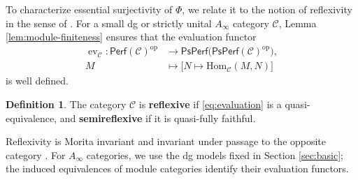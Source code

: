\documentclass[11pt,letterpaper,reqno]{amsart}
\theoremstyle{plain}
\theoremstyle{definition}
\newtheorem{definition}[definition]{Definition}
\theoremstyle{plain}
\theoremstyle{definition}
\numberwithin{equation}{section}
\begin{document}
To characterize essential surjectivity of $\Phi$, we relate it to the notion of reflexivity in the sense of \cite[Definition 2.1.1 and Remark 2.1.5(2)]{Booth-Goodbody-Opper2025}.
For a small dg or strictly unital $A_\infty$ category $\mathscr C$, Lemma \ref{lem:module-finiteness} ensures that the evaluation functor
\begin{equation}\label{eq:evaluation}
\begin{aligned}
\operatorname{ev}_{\mathscr C}:\mathsf{Perf}(\mathscr C)^{\mathrm{op}}
&\longrightarrow\mathsf{PsPerf}\bigl(\mathsf{PsPerf}(\mathscr C)^{\mathrm{op}}\bigr),\\
M&\longmapsto\bigl[N\longmapsto\mathrm{Hom}_{\mathscr C}(M,N)\bigr]
\end{aligned}
\end{equation}
is well defined. 

\begin{definition}\label{def:reflexivity}
The category $\mathscr C$ is \textbf{reflexive} if \eqref{eq:evaluation} is a quasi-equivalence, and \textbf{semireflexive} if it is quasi-fully faithful.
\end{definition}

Reflexivity is Morita invariant \cite[Proposition 3.8]{Goodbody2026} and invariant under passage to the opposite category \cite[Remark 2.1.5(1)]{Booth-Goodbody-Opper2025}.
For $A_\infty$ categories, we use the dg models fixed in Section \ref{sec:basic}; the induced equivalences of module categories identify their evaluation functors.
\end{document}
